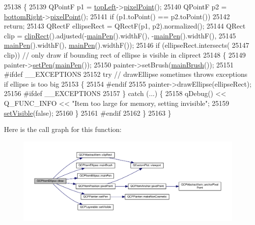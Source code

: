 \begin{DoxyCode}
25138                                              \{
25139   QPointF p1 = \hyperlink{class_q_c_p_item_ellipse_a12fd8420c06718d0c8a2303d6a652848}{topLeft}->\hyperlink{class_q_c_p_item_position_ae490f9c76ee2ba33752c495d3b6e8fb5}{pixelPoint}();
25140   QPointF p2 = \hyperlink{class_q_c_p_item_ellipse_ab73c8deafc0d8d1ef7d75b6cdcc37159}{bottomRight}->\hyperlink{class_q_c_p_item_position_ae490f9c76ee2ba33752c495d3b6e8fb5}{pixelPoint}();
25141   \textcolor{keywordflow}{if} (p1.toPoint() == p2.toPoint())
25142     \textcolor{keywordflow}{return};
25143   QRectF ellipseRect = QRectF(p1, p2).normalized();
25144   QRect clip = \hyperlink{class_q_c_p_abstract_item_a538e25ff8856534582f5b2b400a46405}{clipRect}().adjusted(-\hyperlink{class_q_c_p_item_ellipse_afc78d49ed5ffa886bccf18f297f83d30}{mainPen}().widthF(), -\hyperlink{class_q_c_p_item_ellipse_afc78d49ed5ffa886bccf18f297f83d30}{mainPen}().widthF(),
25145                                    \hyperlink{class_q_c_p_item_ellipse_afc78d49ed5ffa886bccf18f297f83d30}{mainPen}().widthF(), \hyperlink{class_q_c_p_item_ellipse_afc78d49ed5ffa886bccf18f297f83d30}{mainPen}().widthF());
25146   \textcolor{keywordflow}{if} (ellipseRect.intersects(
25147           clip)) \textcolor{comment}{// only draw if bounding rect of ellipse is visible in cliprect}
25148   \{
25149     painter->\hyperlink{class_q_c_p_painter_af9c7a4cd1791403901f8c5b82a150195}{setPen}(\hyperlink{class_q_c_p_item_ellipse_afc78d49ed5ffa886bccf18f297f83d30}{mainPen}());
25150     painter->setBrush(\hyperlink{class_q_c_p_item_ellipse_a2a9757204877c9d0fd07adfb26d6b1d8}{mainBrush}());
25151 \textcolor{preprocessor}{#ifdef \_\_EXCEPTIONS}
25152     \textcolor{keywordflow}{try} \textcolor{comment}{// drawEllipse sometimes throws exceptions if ellipse is too big}
25153     \{
25154 \textcolor{preprocessor}{#endif}
25155       painter->drawEllipse(ellipseRect);
25156 \textcolor{preprocessor}{#ifdef \_\_EXCEPTIONS}
25157     \} \textcolor{keywordflow}{catch} (...) \{
25158       qDebug() << Q\_FUNC\_INFO << \textcolor{stringliteral}{"Item too large for memory, setting invisible"};
25159       \hyperlink{class_q_c_p_layerable_a3bed99ddc396b48ce3ebfdc0418744f8}{setVisible}(\textcolor{keyword}{false});
25160     \}
25161 \textcolor{preprocessor}{#endif}
25162   \}
25163 \}
\end{DoxyCode}


Here is the call graph for this function\+:\nopagebreak
\begin{figure}[H]
\begin{center}
\leavevmode
\includegraphics[width=350pt]{class_q_c_p_item_ellipse_afe97ec827adb05f000fe007783faae3c_cgraph}
\end{center}
\end{figure}


